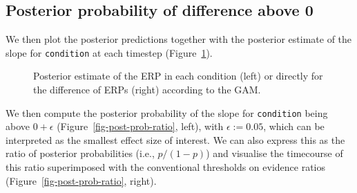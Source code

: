 \documentclass[
  doc,
  floatsintext,
  longtable,
  a4paper,
  nolmodern,
  notxfonts,
  notimes,
  colorlinks=true,linkcolor=blue,citecolor=blue,urlcolor=blue]{apa7}
\begin{document}
\subsection{Posterior probability of difference above
0}\label{posterior-probability-of-difference-above-0}

We then plot the posterior predictions together with the posterior
estimate of the slope for \texttt{condition} at each timestep
(Figure~\ref{fig-plot-post-slope}).

\begin{figure}[!htb]

\caption{\label{fig-plot-post-slope}Posterior estimate of the ERP in
each condition (left) or directly for the difference of ERPs (right)
according to the GAM.}


\end{figure}%

We then compute the posterior probability of the slope for
\texttt{condition} being above \(0+\epsilon\)
(Figure~\ref{fig-post-prob-ratio}, left), with \(\epsilon := 0.05\),
which can be interpreted as the smallest effect size of interest. We can
also express this as the ratio of posterior probabilities (i.e.,
\(p/(1-p)\)) and visualise the timecourse of this ratio superimposed
with the conventional thresholds on evidence ratios
(Figure~\ref{fig-post-prob-ratio}, right).
\end{document}
